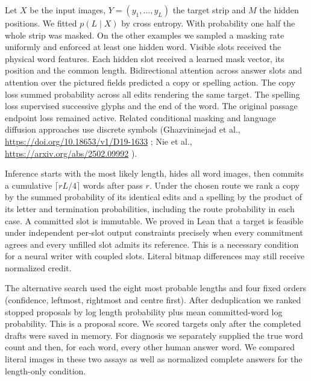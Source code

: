 \documentclass[12pt,a4paper]{article}
\providecommand{\DIFadd}[1]{{\protect\color{blue} \sf #1}} %
\begin{document}
\DIFadd{Let $X$ be the input images, $Y=(y_1,\ldots,y_L)$ the target strip and $M$ the hidden positions. We fitted $p(L\mid X)$ by cross entropy. With probability one half the whole strip was masked. On the other examples we sampled a masking rate uniformly and enforced at least one hidden word. Visible slots received the physical word features. Each hidden slot received a learned mask vector, its position and the common length. Bidirectional attention across answer slots and attention over the pictured fields predicted a copy or spelling action. The copy loss summed probability across all edits rendering the same target. The spelling loss supervised successive glyphs and the end of the word. The original passage endpoint loss remained active. Related conditional masking and language diffusion approaches use discrete symbols (Ghazvininejad et al., }\url{https://doi.org/10.18653/v1/D19-1633}\DIFadd{; Nie et al., }\url{https://arxiv.org/abs/2502.09992}\DIFadd{).
}

\DIFadd{Inference starts with the most likely length, hides all word images, then commits a cumulative $\lceil rL/4\rceil$ words after pass $r$. Under the chosen route we rank a copy by the summed probability of its identical edits and a spelling by the product of its letter and termination probabilities, including the route probability in each case. A committed slot is immutable. We proved in Lean that a target is feasible under independent per-slot output constraints precisely when every commitment agrees and every unfilled slot admits its reference. This is a necessary condition for a neural writer with coupled slots. Literal bitmap differences may still receive normalized credit.
}

\DIFadd{The alternative search used the eight most probable lengths and four fixed orders (confidence, leftmost, rightmost and centre first). After deduplication we ranked stopped proposals by log length probability plus mean committed-word log probability. This is a proposal score. We scored targets only after the completed drafts were saved in memory. For diagnosis we separately supplied the true word count and then, for each word, every other human answer word. We compared literal images in these two assays as well as normalized complete answers for the length-only condition.
}
\end{document}
